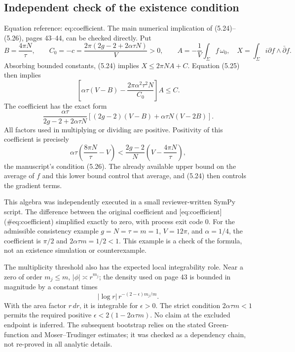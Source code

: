 \documentclass[10pt]{article}
\begin{document}
\subsection*{Independent check of the existence condition}
Equation reference: eq:coefficient. The main numerical implication of (5.24)–(5.26), pages 43–44, can be checked directly. Put \[B=\frac{4\pi N}{\tau},\qquad
C_0=-c=\frac{2\pi(2g-2+2\alpha\tau N)}{V}>0,\qquad
A=-\frac{1}{V}\int_\Sigma f\,\omega_0,
\quad X=\int_\Sigma i\partial f\wedge\bar\partial f.\] Absorbing bounded constants, (5.24) implies \(X\leq 2\pi N A+C\). Equation (5.25) then implies \[\left[\alpha\tau(V-B)-\frac{2\pi\alpha^2\tau^2N}{C_0}\right]A\leq C.\] The coefficient has the exact form \[\frac{\alpha\tau}{2g-2+2\alpha\tau N}
\left[(2g-2)(V-B)+\alpha\tau N(V-2B)\right].
\] All factors used in multiplying or dividing are positive. Positivity of this coefficient is precisely \[\alpha\tau\left(\frac{8\pi N}{\tau}-V\right)
  <\frac{2g-2}{N}\left(V-\frac{4\pi N}{\tau}\right),\] the manuscript’s condition (5.26). The already available upper bound on the average of \(f\) and this lower bound control that average, and (5.24) then controls the gradient terms.\par
This algebra was independently executed in a small reviewer-written SymPy script. The difference between the original coefficient and [eq:coefficient] (\#eq:coefficient) simplified exactly to zero, with process exit code 0. For the admissible consistency example \(g=N=\tau=m=1\), \(V=12\pi\), and \(\alpha=1/4\), the coefficient is \(\pi/2\) and \(2\alpha\tau m=1/2<1\). This example is a check of the formula, not an existence simulation or counterexample.\par
The multiplicity threshold also has the expected local integrability role. Near a zero of order \(m_j\leq m\), \(|\phi|\asymp r^{m_j}\); the density used on page 43 is bounded in magnitude by a constant times \[|\log r|\,r^{-(2-\epsilon)m_j/m}.\] With the area factor \(r\,dr\), it is integrable for \(\epsilon>0\). The strict condition \(2\alpha\tau m<1\) permits the required positive \(\epsilon<2(1-2\alpha\tau m)\). No claim at the excluded endpoint is inferred. The subsequent bootstrap relies on the stated Green-function and Moser–Trudinger estimates; it was checked as a dependency chain, not re-proved in all analytic details.\par
\end{document}
